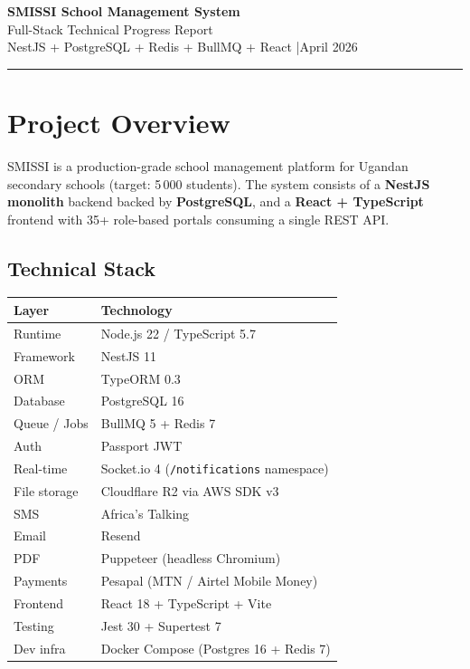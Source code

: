 \documentclass[11pt, a4paper]{article}
\newcommand{\code}[1]{\texttt{\small #1}}
\begin{document}
\begin{center}
  {\LARGE \textbf{SMISSI School Management System}}\\[6pt]
  {\large Full-Stack Technical Progress Report}\\[4pt]
  {\normalsize NestJS + PostgreSQL + Redis + BullMQ + React \quad|\quad April 2026}
\end{center}

\vspace{0.5em}
\hrule
\vspace{1em}

\section{Project Overview}

SMISSI is a production-grade school management platform for Ugandan secondary
schools (target: 5\,000 students). The system consists of a \textbf{NestJS monolith}
backend backed by \textbf{PostgreSQL}, and a \textbf{React + TypeScript} frontend
with 35+ role-based portals consuming a single REST API.

\subsection*{Technical Stack}

\begin{tabular}{@{}ll@{}}
  \toprule
  Layer & Technology \\
  \midrule
  Runtime & Node.js 22 / TypeScript 5.7 \\
  Framework & NestJS 11 \\
  ORM & TypeORM 0.3 \\
  Database & PostgreSQL 16 \\
  Queue / Jobs & BullMQ 5 + Redis 7 \\
  Auth & Passport JWT \\
  Real-time & Socket.io 4 (\code{/notifications} namespace) \\
  File storage & Cloudflare R2 via AWS SDK v3 \\
  SMS & Africa's Talking \\
  Email & Resend \\
  PDF & Puppeteer (headless Chromium) \\
  Payments & Pesapal (MTN / Airtel Mobile Money) \\
  Frontend & React 18 + TypeScript + Vite \\
  Testing & Jest 30 + Supertest 7 \\
  Dev infra & Docker Compose (Postgres 16 + Redis 7) \\
  \bottomrule
\end{tabular}
\end{document}
